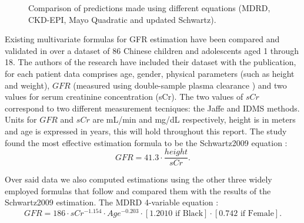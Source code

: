\documentclass[10pt,final]{siamltex}
\begin{document}
\begin{figure}[ht]
  \centering
  \caption{Comparison of predictions made using different equations (MDRD, CKD-EPI, Mayo Quadratic and updated Schwartz).}
  \label{equations}
\end{figure}

Existing multivariate formulas for GFR estimation have been compared and validated in \cite{gfr} over a dataset of 86 Chinese children and adolescents aged 1 through 18. The authors of the research have included their dataset with the publication, for each patient data comprises age, gender, physical parameters (such as height and weight), $GFR$ (measured using double-sample plasma clearance \cite{gold}) and two values for serum creatinine concentration (sCr). The two values of $sCr$ correspond to two different measurement tecniques: the Jaffe\cite{jaffe} and IDMS\cite{idms} methods. Units for $GFR$ and $sCr$ are mL/min and mg/dL respectively, height is in meters and age is expressed in years, this will hold throughout this report.
The study \cite{gfr} found the most effective estimation formula to be the Schwartz2009 equation \cite{schwartz}:
$$ GFR = 41.3 \cdot \frac{height}{sCr}.$$

Over said data we also computed estimations using the other three widely employed formulas that follow and compared them with the results of the Schwartz2009 estimation. The MDRD 4-variable equation \cite{MDRD}:
$$ GFR = 186 \cdot sCr^{-1.154}\cdot Age^{-0.203} \cdot [1.2010 \text{ if Black}] \cdot [0.742 \text{ if Female}].$$
\end{document}
